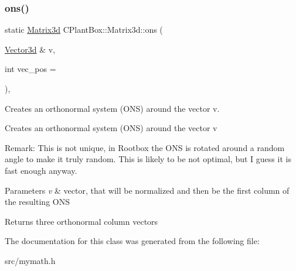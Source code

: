 \subsubsection{\texorpdfstring{ons()}{ons()}}
{\footnotesize\ttfamily static \hyperlink{classCPlantBox_1_1Matrix3d}{Matrix3d} C\+Plant\+Box\+::\+Matrix3d\+::ons (\begin{DoxyParamCaption}\item[{\hyperlink{classCPlantBox_1_1Vector3d}{Vector3d} \&}]{v,  }\item[{int}]{vec\+\_\+pos = {} }\end{DoxyParamCaption})\hspace{0.3cm}{\ttfamily [inline]}, {\ttfamily [static]}}



Creates an orthonormal system (O\+NS) around the vector v. 

Creates an orthonormal system (O\+NS) around the vector v

Remark\+: This is not unique, in Rootbox the O\+NS is rotated around a random angle to make it truly random. This is likely to be not optimal, but I guess it is fast enough anyway.


\begin{DoxyParams}{Parameters}
{\em v} & vector, that will be normalized and then be the first column of the resulting O\+NS\\
\hline
\end{DoxyParams}
\begin{DoxyReturn}{Returns}
three orthonormal column vectors 
\end{DoxyReturn}


The documentation for this class was generated from the following file\+:\begin{DoxyCompactItemize}
\item 
src/mymath.\+h\end{DoxyCompactItemize}
